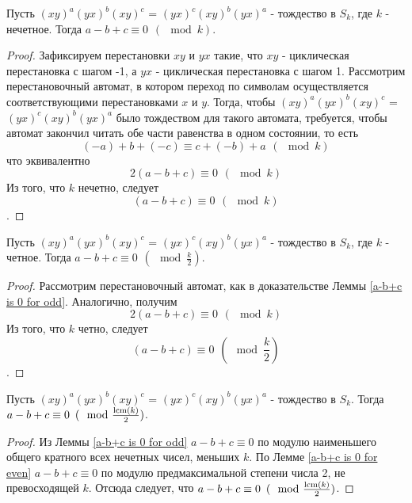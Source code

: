 	\begin{lemma} \label{a-b+c is 0 for odd}
		Пусть $(xy)^a(yx)^b(xy)^c$ = $(yx)^c(xy)^b(yx)^a$ - тождество в $S_k$, где $k$ - нечетное. Тогда $a - b + c \equiv 0 \hspace{5pt} (\mod k)$.
	\end{lemma}
	\begin{proof}
		Зафиксируем перестановки $xy$ и $yx$ %
		такие, что $xy$ - циклическая перестановка с шагом -1, а $yx$ - циклическая перестановка с шагом 1.
		Рассмотрим перестановочный автомат, в котором переход по символам осуществляется соответствующими перестановками $x$ и $y$. Тогда, чтобы $(xy)^a(yx)^b(xy)^c$ = $(yx)^c(xy)^b(yx)^a$ было тождеством для такого автомата, требуется, чтобы автомат закончил читать обе части равенства в одном состоянии, то есть	
		\begin{equation}
		(-a) + b + (-c) \equiv c + (-b) + a \hspace{5pt} (\mod k)
		\end{equation}
		что эквивалентно 
		\begin{equation}
		2(a - b + c) \equiv 0 \hspace{5pt} (\mod k)
		\end{equation}
		Из того, что $k$ нечетно, следует 
		$$
		(a - b + c) \equiv 0 \hspace{5pt} (\mod k)
		$$.
	\end{proof}
	
	\begin{lemma} \label{a-b+c is 0 for even}
		Пусть $(xy)^a(yx)^b(xy)^c$ = $(yx)^c(xy)^b(yx)^a$ - тождество в $S_k$, где $k$ - четное. Тогда $a - b + c \equiv 0 \hspace{5pt} (\mod \frac{k}{2})$.
	\end{lemma}
	\begin{proof}
		Рассмотрим перестановочный автомат, как в доказательстве Леммы \ref{a-b+c is 0 for odd}. Аналогично, получим	
		\begin{equation}
		2(a - b + c) \equiv 0 \hspace{5pt} (\mod k)
		\end{equation}
		Из того, что $k$ четно, следует 
		$$
		(a - b + c) \equiv 0 \hspace{5pt} (\mod \frac{k}{2})
		$$.
	\end{proof}
	
	\begin{corollary} \label{a-b+c is 0 mod lcm/2}
		Пусть $(xy)^a(yx)^b(xy)^c$ = $(yx)^c(xy)^b(yx)^a$ - тождество в $S_k$. Тогда $a - b + c \equiv 0 \hspace{5pt} (\mod \frac{\operatorname{lcm}(k)}{2})$.
	\end{corollary}
	\begin{proof}
		Из Леммы \ref{a-b+c is 0 for odd} $a - b + c \equiv 0$ по модулю наименьшего общего кратного всех нечетных чисел, меньших $k$.
		По Лемме \ref{a-b+c is 0 for even} $a - b + c \equiv 0$ по модулю предмаксимальной степени числа 2, не превосходящей $k$.
		Отсюда следует, что $a - b + c \equiv 0 \hspace{5pt} (\mod \frac{\operatorname{lcm}(k)}{2})$.
	\end{proof}
	
